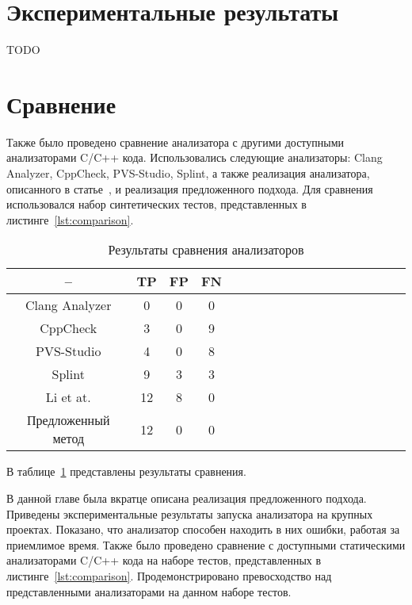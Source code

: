 \section{Экспериментальные результаты}

TODO

\section{Сравнение}

Также было проведено сравнение анализатора с другими доступными
анализаторами C/C++ кода. Использовались следующие анализаторы: Clang
Analyzer, CppCheck, PVS-Studio, Splint, а также реализация
анализатора, описанного в статье~\cite{li2010practical}, и реализация
предложенного подхода. Для сравнения использовался набор синтетических
тестов, представленных в листинге~\ref{lst:comparison}.

\begin{table}[!h]
\caption{Результаты сравнения анализаторов}\label{tab:comparison}
\centering
  \begin{tabular}{|*{18}{c|}}\hline
  --                 & TP  & FP & FN \\\hline
  Clang Analyzer     & 0   & 0  & 0  \\\hline
  CppCheck           & 3   & 0  & 9  \\\hline
  PVS-Studio         & 4   & 0  & 8  \\\hline
  Splint             & 9   & 3  & 3  \\\hline
  Li et at.          & 12  & 8  & 0  \\\hline
  Предложенный метод & 12  & 0  & 0  \\\hline
  \end{tabular}
\end{table}

В таблице~\ref{tab:comparison} представлены результаты сравнения.

\chapterconclusion

В данной главе была вкратце описана реализация предложенного
подхода. Приведены экспериментальные результаты запуска анализатора на
крупных проектах. Показано, что анализатор способен находить в них
ошибки, работая за приемлимое время. Также было проведено сравнение с
доступными статическими анализаторами C/C++ кода на наборе тестов,
представленных в листинге~\ref{lst:comparison}. Продемонстрировано
превосходство над представленными анализаторами на данном наборе
тестов.
